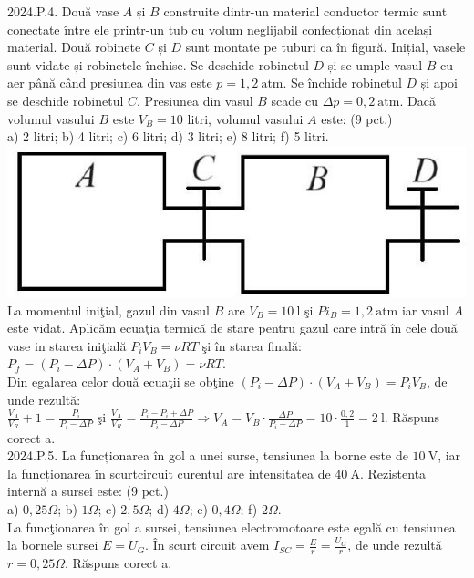 2024.P.4. Două vase $A$ și $B$ construite dintr-un material conductor termic sunt conectate între ele printr-un tub cu volum neglijabil confecționat din același material. Două robinete $C$ și $D$ sunt montate pe tuburi ca în figură. Inițial, vasele sunt vidate și robinetele închise. Se deschide robinetul $D$ și se umple vasul $B$ cu aer până când presiunea din vas este $p=1,2 \mathrm{~atm}$. Se închide robinetul $D$ și apoi se deschide robinetul $C$. Presiunea din vasul $B$ scade cu $\Delta p=0,2 \mathrm{~atm}$. Dacă volumul vasului $B$ este $V_{B}=10$ litri, volumul vasului $A$ este: (9 pct.)\\ a) 2 litri; b) 4 litri; c) 6 litri; d) 3 litri; e) 8 litri; f) 5 litri.\\ \includegraphics[width=0.4\linewidth]{images/2025_08_27_d74d983b3f0f59c27780g-2}\\ La momentul iniţial, gazul din vasul $B$ are $V_{B}=10 \mathrm{~l}$ şi $P i_{B}=1,2 \mathrm{~atm}$ iar vasul $A$ este vidat. Aplicăm ecuaţia termică de stare pentru gazul care intră în cele două vase in starea iniţială $P_{i} V_{B}=\nu R T$ şi în starea finală:\\ $P_{f}=(P_{i}-\Delta P) \cdot\left(V_{A}+V_{B}\right)=\nu R T$.\\ Din egalarea celor două ecuaţii se obţine $(P_{i}-\Delta P) \cdot\left(V_{A}+V_{B}\right)=P_{i} V_{B}$, de unde rezultă:\\ $\frac{V_{A}}{V_{R}}+1=\frac{P_{i}}{P_{i}-\Delta P}$ şi $\frac{V_{A}}{V_{R}}=\frac{P_{i}-P_{i}+\Delta P}{P_{i}-\Delta P} \Rightarrow V_{A}=V_{B} \cdot \frac{\Delta P}{P_{i}-\Delta P}=10 \cdot \frac{0,2}{1}=2 \mathrm{~l}$. Răspuns corect a.\\

2024.P.5. La funcționarea în gol a unei surse, tensiunea la borne este de $10 \mathrm{~V}$, iar la funcționarea în scurtcircuit curentul are intensitatea de $40 \mathrm{~A}$. Rezistența internă a sursei este: (9 pct.)\\ a) $0,25 \Omega$; b) $1 \Omega$; c) $2,5 \Omega$; d) $4 \Omega$; e) $0,4 \Omega$; f) $2 \Omega$.\\ La funcţionarea în gol a sursei, tensiunea electromotoare este egală cu tensiunea la bornele sursei $E=U_{G}$. În scurt circuit avem $I_{SC}=\frac{E}{r}=\frac{U_{G}}{r}$, de unde rezultă $r=0,25 \Omega$. Răspuns corect a.\\

